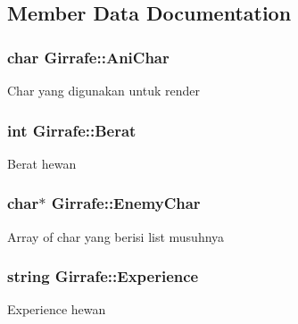 \subsection{Member Data Documentation}
\subsubsection[{\texorpdfstring{Ani\+Char}{AniChar}}]{\setlength{\rightskip}{0pt plus 5cm}char Girrafe\+::\+Ani\+Char\hspace{0.3cm}{\ttfamily [protected]}}\hypertarget{class_girrafe_af6a3413182228d1860091655f94ee6f9}{}\label{class_girrafe_af6a3413182228d1860091655f94ee6f9}
Char yang digunakan untuk render 
\subsubsection[{\texorpdfstring{Berat}{Berat}}]{\setlength{\rightskip}{0pt plus 5cm}int Girrafe\+::\+Berat\hspace{0.3cm}{\ttfamily [protected]}}\hypertarget{class_girrafe_a23da68b0bc8e986aeeb3e2023ef6a099}{}\label{class_girrafe_a23da68b0bc8e986aeeb3e2023ef6a099}
Berat hewan 
\subsubsection[{\texorpdfstring{Enemy\+Char}{EnemyChar}}]{\setlength{\rightskip}{0pt plus 5cm}char$\ast$ Girrafe\+::\+Enemy\+Char\hspace{0.3cm}{\ttfamily [protected]}}\hypertarget{class_girrafe_ac1caa525a024d713ef14f62db21775f2}{}\label{class_girrafe_ac1caa525a024d713ef14f62db21775f2}
Array of char yang berisi list musuhnya 
\subsubsection[{\texorpdfstring{Experience}{Experience}}]{\setlength{\rightskip}{0pt plus 5cm}string Girrafe\+::\+Experience\hspace{0.3cm}{\ttfamily [protected]}}\hypertarget{class_girrafe_a1658382b7ca9c6cd40cae9824710df1b}{}\label{class_girrafe_a1658382b7ca9c6cd40cae9824710df1b}
Experience hewan 
